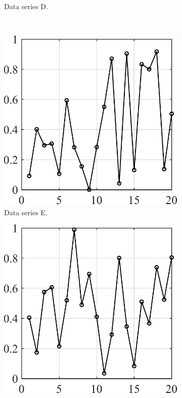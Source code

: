 \documentclass[a4paper]{article}
\begin{document}
\begin{figure}[h!]
\begin{subfigure}[b]{\CE\textwidth}
    \caption{Data series D.}
    \label{fig-d}
\end{subfigure}\\
\begin{subfigure}[b]{\CE\textwidth}
    \includegraphics[width=\textwidth]{pic-5.pdf}
    \caption{Data series E.}
    \label{fig-e}
\end{subfigure}
\hfill
\begin{subfigure}[b]{\CE\textwidth}
    \includegraphics[width=\textwidth]{pic-6.pdf}

\end{subfigure}
\end{figure}
\end{document}
